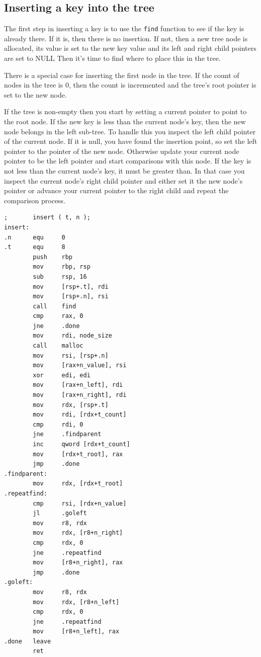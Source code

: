 \documentclass[11pt,b5paper]{book}
\begin{document}
\subsection{Inserting a key into the tree}

The first step in inserting a key is to use the {\tt find} function to see if the key is already there.
If it is, then there is no insertion.
If not, then a new tree node is allocated, its value is set to the new key value and its left and right child
pointers are set to NULL
Then it's time to find where to place this in the tree.

There is a special case for inserting the first node in the tree.
If the count of nodes in the tree is 0, then the count is incremented and the tree's root pointer is set to the new node.

If the tree is non-empty then you start by setting a current pointer to point to the root node.
If the new key is less than the current node's key, then the new node belongs in the left sub-tree.
To handle this you inspect the left child pointer of the current node.
If it is null, you have found the insertion point, so set the left pointer to the pointer of the new node.
Otherwise update your current node pointer to be the left pointer and start comparisons with this node.
If the key is not less than the current node's key, it must be greater than.
In that case you inspect the current node's right child pointer and either set it the new node's pointer or
advance your current pointer to the right child and repeat the comparison process.

\begin{verbatim}
;       insert ( t, n );
insert:
.n      equ     0
.t      equ     8
        push    rbp
        mov     rbp, rsp
        sub     rsp, 16
        mov     [rsp+.t], rdi
        mov     [rsp+.n], rsi
        call    find
        cmp     rax, 0
        jne     .done 
        mov     rdi, node_size
        call    malloc
        mov     rsi, [rsp+.n]
        mov     [rax+n_value], rsi
        xor     edi, edi
        mov     [rax+n_left], rdi
        mov     [rax+n_right], rdi
        mov     rdx, [rsp+.t]
        mov     rdi, [rdx+t_count]
        cmp     rdi, 0
        jne     .findparent
        inc     qword [rdx+t_count]
        mov     [rdx+t_root], rax
        jmp     .done
.findparent:
        mov     rdx, [rdx+t_root]
.repeatfind:
        cmp     rsi, [rdx+n_value]
        jl      .goleft
        mov     r8, rdx
        mov     rdx, [r8+n_right]
        cmp     rdx, 0
        jne     .repeatfind
        mov     [r8+n_right], rax
        jmp     .done
.goleft:
        mov     r8, rdx
        mov     rdx, [r8+n_left]
        cmp     rdx, 0
        jne     .repeatfind
        mov     [r8+n_left], rax
.done   leave
        ret
\end{verbatim}
\end{document}
